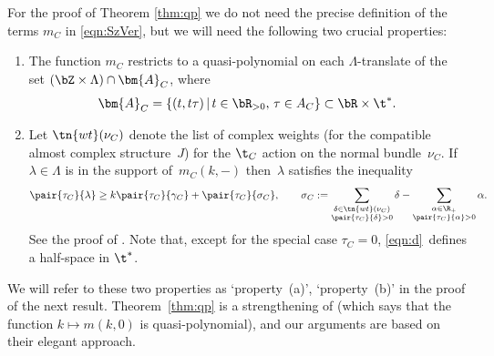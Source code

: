For the proof of Theorem \ref{thm:qp} we do not need the precise definition of the terms $m_C$ in \eqref{eqn:SzVer}, but we will need the following two crucial properties:
\begin{enumerate}\itemsep=0pt
\item The function $m_C$ restricts to a quasi-polynomial on each $\Lambda$-translate of the set $(\bZ\times \Lambda)\cap \bm{A}_C$, where
\[ \bm{A}_C=\{(t,t\tau)\,|\,t\in \bR_{>0}, \,\tau \in A_C\} \subset \bR \times \t^\ast.\]
\item Let $\tn{wt}(\nu_C)$ denote the list of complex weights (for the compatible almost complex structure~$J$) for the $\t_C$ action on the normal bundle~$\nu_C$. If $\lambda \in \Lambda$ is in the support of~$m_C(k,-)$ then~$\lambda$ satisfies the inequality
\begin{gather}\label{eqn:d}
\pair{\tau_C}{\lambda}\ge k\pair{\tau_C}{\gamma_C}+\pair{\tau_C}{\sigma_C}, \qquad \sigma_C:=\sum_{\substack{\delta \in \tn{wt}(\nu_C)\\ \pair{\tau_C}{\delta}>0}} \delta-\sum_{\substack{\alpha \in \R_+ \\ \pair{\tau_C}{\alpha}>0}}\alpha.
\end{gather}
See the proof of \cite[Theorem~49]{SzenesVergne2010}. Note that, except for the special case $\tau_C=0$, \eqref{eqn:d}~defines a half-space in $\t^\ast$.
\end{enumerate}
We will refer to these two properties as `property~(a)', `property~(b)' in the proof of the next result. Theorem~\ref{thm:qp} is a strengthening of \cite[Theorem~49]{SzenesVergne2010} (which says that the function $k \mapsto m(k,0)$ is quasi-polynomial), and our arguments are based on their elegant approach.

